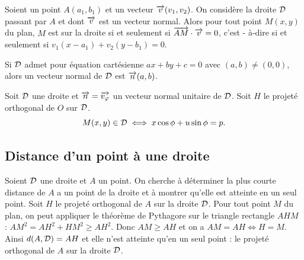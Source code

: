 \begin{prop}
    Soient un point \(A(a_1 , b_1)\) et un vecteur \(\overrightarrow{v}(v_1 , v_2)\). On considère 
    la droite \(\mathcal{D}\) passant par \(A\) et dont \(\overrightarrow{v}\) est un vecteur normal. 
    Alors pour tout point \(M(x , y)\) du plan, \(M\) est sur la droite si et 
    seulement si \(\overrightarrow{AM}\cdot\overrightarrow{v} = 0\), c'est - à-dire si et seulement si 
    \(v_1(x - a_1) + v_2(y - b_1) = 0\).
\end{prop}

Si \(\mathcal{D}\) admet pour équation cartésienne \(ax + by + c = 0\) avec \((a , b) \neq 
(0 , 0)\), alors un vecteur normal de \(\mathcal{D}\) est \(\overrightarrow{n}(a , b)\).

\begin{prop}
    Soit \(\mathcal{D}\) une droite et \(\overrightarrow{n} = \overrightarrow{v_\varphi}\) un vecteur normal 
    unitaire de \(\mathcal{D}\). Soit \(H\) le projeté orthogonal de \(O\) sur \(\mathcal{D}\).
    \begin{equation}
        M(x , y) \in \mathcal{D} \iff x\cos\phi + u \sin\phi = p.
    \end{equation}
\end{prop}

\subsection{Distance d'un point à une droite}

Soient \(\mathcal{D}\) une droite et \(A\) un point. On cherche à déterminer la plus 
courte distance de \(A\) a un point de la droite et à montrer qu'elle est 
atteinte en un seul point. Soit \(H\) le projeté orthogonal de \(A\) sur la 
droite \(\mathcal{D}\). Pour tout point \(M\) du plan, on peut appliquer le théorème de 
Pythagore sur le triangle rectangle \(AHM\) : \(AM^2 = AH^2 + HM^2 \geqslant 
AH^2\). Donc \(AM \geqslant AH\) et on a \(AM = AH \iff H = M\). Ainsi 
\(d(A , \mathcal{D}) = AH\) et elle n'est atteinte qu'en un seul point : le projeté 
orthogonal de \(A\) sur la droite \(\mathcal{D}\).

